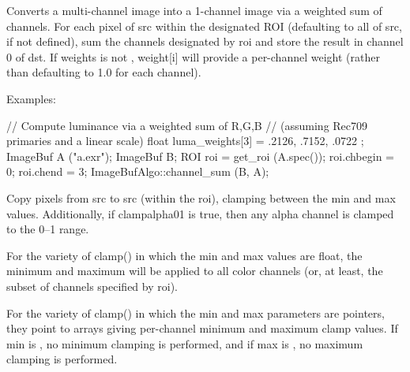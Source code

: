  
Converts a multi-channel image into a 1-channel image via a weighted sum
of channels.  For each pixel of {\cf src} within the designated ROI
(defaulting to all of {\cf src}, if not defined), sum the channels
designated by {\cf roi} and store the result in channel 0 of {\cf dst}.
If {\cf weights} is not \NULL, {\cf weight[i]} will provide a
per-channel weight (rather than defaulting to 1.0 for each channel).

\smallskip
\noindent Examples:
\begin{code}
    // Compute luminance via a weighted sum of R,G,B
    // (assuming Rec709 primaries and a linear scale)
    float luma_weights[3] = { .2126, .7152, .0722 };
    ImageBuf A ("a.exr");
    ImageBuf B;
    ROI roi = get_roi (A.spec());
    roi.chbegin = 0;  roi.chend = 3;
    ImageBufAlgo::channel_sum (B, A);
\end{code}
\apiend


 

Copy pixels from {\cf src} to {\cf src} (within the {\cf roi}), clamping
between the {\cf min} and {\cf max} values.  Additionally, if
{\cf clampalpha01} is {\cf true}, then any alpha 
channel is clamped to the 0--1 range.

For the variety of {\cf clamp()} in which the {\cf min} and {\cf max}
values are {\cf float}, the minimum and maximum will be applied to
all color channels (or, at least, the subset of channels specified by
{\cf roi}).

For the variety of {\cf clamp()} in which the {\cf min} and {\cf max}
parameters are pointers, they point to arrays giving per-channel minimum
and maximum clamp values.  If {\cf min} is \NULL, no minimum clamping is
performed, and if {\cf max} is \NULL, no maximum clamping is performed.

